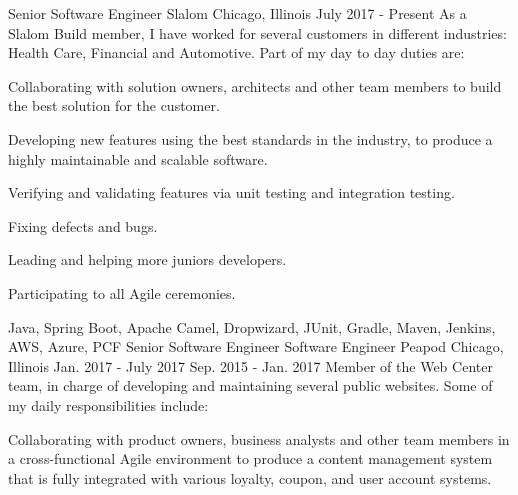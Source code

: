 
\begin{cventries}

  \cventryfive
    {Senior Software Engineer} %
    {Slalom} %
    {Chicago, Illinois} %
    {July 2017 - Present} %
    {As a Slalom Build member, I have worked for several customers in different industries: Health Care, Financial and Automotive. Part of my day to day duties are:}
    {
      \begin{cvitems} %
      	\item {Collaborating with solution owners, architects and other team members to build the best solution for the customer.}
      	\item {Developing new features using the best standards in the industry, to produce a highly maintainable and scalable software.}
      	\item {Verifying and validating features via unit testing and integration testing.}
      	\item {Fixing defects and bugs.}
      	\item {Leading and helping more juniors developers.}
        \item {Participating to all Agile ceremonies.}
      \end{cvitems}
    }
    {Java, Spring Boot, Apache Camel, Dropwizard, JUnit, Gradle, Maven, Jenkins, AWS, Azure, PCF}
  \cventryfour
    {Senior Software Engineer} %
    {Software Engineer} %
    {Peapod} %
    {Chicago, Illinois} %
    {Jan. 2017 - July 2017} %
    {Sep. 2015 - Jan. 2017} %
    {Member of the Web Center team, in charge of developing and maintaining several public websites. Some of my daily responsibilities include:} %
    {
    \begin{cvitems}
  \item Collaborating with product owners, business analysts and other team members in a cross-functional Agile environment to produce a content management system that is fully integrated with various loyalty, coupon, and user account systems.

\end{cvitems}}
\end{cventries}
